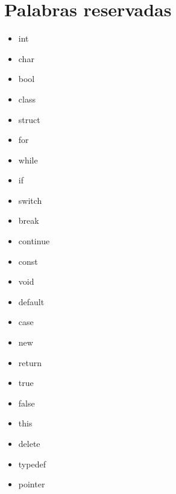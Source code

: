 \documentclass{article}
\begin{document}
\section{Palabras reservadas}
\begin{multicols}{4}
\begin{itemize}
    \item int
    \item char
    \item bool
    \item class
    \item struct
    \item for
    \item while
    \item if
    \item switch
    \item break
    \item continue
    \item const
    \item void
    \item default
    \item case
    \item new
    \item return
    \item true
    \item false
    \item this
    \item delete
    \item typedef
    \item pointer

\end{itemize}
\end{multicols}
\end{document}

